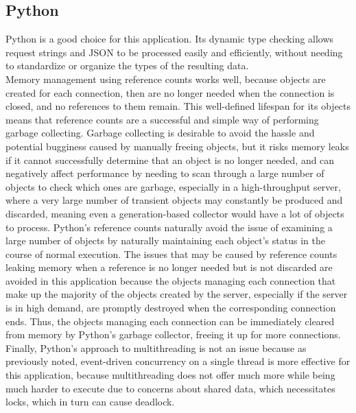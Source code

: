 \documentclass[letterpaper,twocolumn,10pt]{article}
\begin{document}
\subsection{Python}
Python is a good choice for this application. Its dynamic type checking allows request strings and JSON to be processed easily and efficiently, without needing to standardize or organize the types of the resulting data. \\
Memory management using reference counts works well, because objects are created for each connection, then are no longer needed when the connection is closed, and no references to them remain. This well-defined lifespan for its objects means that reference counts are a successful and simple way of performing garbage collecting. Garbage collecting is desirable to avoid the hassle and potential bugginess caused by manually freeing objects, but it risks memory leaks if it cannot successfully determine that an object is no longer needed, and can negatively affect performance by needing to scan through a large number of objects to check which ones are garbage, especially in a high-throughput server, where a very large number of transient objects may constantly be produced and discarded, meaning even a generation-based collector would have a lot of objects to process. Python's reference counts naturally avoid the issue of examining a large number of objects by naturally maintaining each object's status in the course of normal execution. The issues that may be caused by reference counts leaking memory when a reference is no longer needed but is not discarded are avoided in this application because the objects managing each connection that make up the majority of the objects created by the server, especially if the server is in high demand, are promptly destroyed when the corresponding connection ends. Thus, the objects managing each connection can be immediately cleared from memory by Python's garbage collector, freeing it up for more connections. \\
Finally, Python's approach to multithreading is not an issue because as previously noted, event-driven concurrency on a single thread is more effective for this application, because multithreading does not offer much more while being much harder to execute \cite{claburn} due to concerns about shared data, which necessitates locks, which in turn can cause deadlock.
\end{document}
